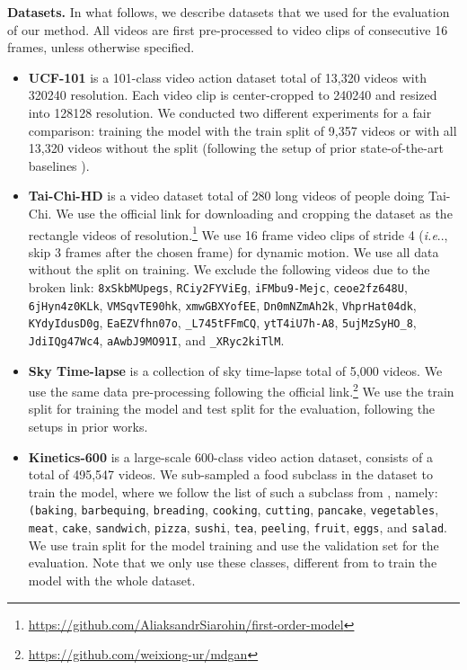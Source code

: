 \documentclass{article} \usepackage{iclr2022_conference,times}
\makeatletter
\DeclareRobustCommand\onedot{\futurelet\@let@token\@onedot}
\def\@onedot{\ifx\@let@token.\else.\null\fi\xspace}
\def\ie{\emph{i.e}\onedot} \def\Ie{\emph{I.e}\onedot}
\makeatother
\begin{document}
\textbf{Datasets.}
In what follows, we describe datasets that we used for the evaluation of our method. All videos are first pre-processed to video clips of consecutive 16 frames, unless otherwise specified.
\begin{itemize}[leftmargin=0.2in]
\item \textbf{UCF-101} \citep{soomro2012ucf101} is a 101-class video action dataset total of 13,320 videos with 320240 resolution. Each video clip is center-cropped to 240240 and resized into 128128 resolution. We conducted two different experiments for a fair comparison: training the model with the train split of 9,357 videos or with all 13,320 videos without the split (following the setup of prior state-of-the-art baselines \citep{clark2019adversarial, tian2021good}).

\item \textbf{Tai-Chi-HD} \citep{siarohin2019first} is a video dataset total of 280 long videos of people doing Tai-Chi. We use the official link for downloading and cropping the dataset as the rectangle videos of  resolution.\footnote{\url{https://github.com/AliaksandrSiarohin/first-order-model}} We use 16 frame video clips of stride 4 (\ie, skip 3 frames after the chosen frame) for dynamic motion. We use all data without the split on training. We exclude the following videos due to the broken link: \texttt{8xSkbMUpegs}, \texttt{RCiy2FYViEg}, \texttt{iFMbu9-Mejc}, \texttt{ceoe2fz648U}, \texttt{6jHyn4z0KLk}, \texttt{VMSqvTE90hk}, \texttt{xmwGBXYofEE}, \texttt{Dn0mNZmAh2k}, \texttt{VhprHat04dk}, \texttt{KYdyIdusD0g}, \texttt{EaEZVfhn07o}, \texttt{\_L745tFFmCQ}, \texttt{ytT4iU7h-A8}, \texttt{5ujMzSyHO\_8}, \texttt{JdiIQg47Wc4}, \texttt{aAwbJ9MO91I}, and \texttt{\_XRyc2kiTlM}.

\item \textbf{Sky Time-lapse} \citep{xiong2018learning} is a collection of sky time-lapse total of 5,000 videos. We use the same data pre-processing following the official link.\footnote{\url{https://github.com/weixiong-ur/mdgan}} We use the train split for training the model and test split for the evaluation, following the setups in prior works.

\item \textbf{Kinetics-600} \citep{carreira2018short} is a large-scale 600-class video action dataset, consists of a total of 495,547 videos. We sub-sampled a food subclass in the dataset to train the model, where 
we follow the list of such a subclass from \citet{weissenborn2020scaling}, namely: \texttt{(baking}, \texttt{barbequing}, \texttt{breading}, \texttt{cooking}, \texttt{cutting}, \texttt{pancake}, \texttt{vegetables}, \texttt{
meat}, \texttt{cake}, \texttt{sandwich}, \texttt{pizza}, \texttt{sushi}, \texttt{tea}, \texttt{peeling}, \texttt{fruit}, \texttt{eggs}, and \texttt{salad}. We use train split for the model training and use the validation set for the evaluation. Note that we only use these classes, different from \citet{weissenborn2020scaling} to train the model with the whole dataset.

\end{itemize}
\end{document}
